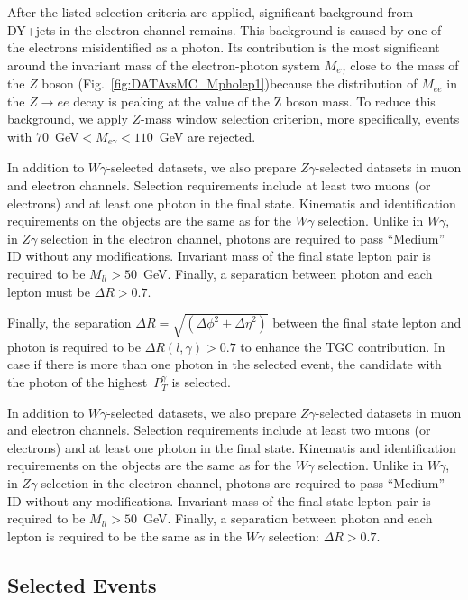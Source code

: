 After the listed selection criteria are applied, significant background from DY+jets in the electron channel remains. This background is caused by one of the electrons misidentified as a photon. Its contribution is the most significant around the invariant mass of the electron-photon system $M_{e\gamma}$ close to the mass of the $Z$ boson (Fig.~\ref{fig:DATAvsMC_Mpholep1})because the distribution of $M_{ee}$ in the $Z\rightarrow e e$ decay is peaking at the value of the Z boson mass. To reduce this background, we apply $Z$-mass window selection criterion, more specifically, events with $70$~GeV$<M_{e\gamma}<110$~GeV are rejected. 

In addition to $W\gamma$-selected datasets, we also prepare $Z\gamma$-selected datasets in muon and electron channels. Selection requirements include at least two muons (or electrons) and at least one photon in the final state. Kinematis and identification requirements on the objects are the same as for the $W\gamma$ selection. Unlike in $W\gamma$, in $Z\gamma$ selection in the electron channel, photons are required to pass ``Medium'' ID without any modifications. Invariant mass of the final state lepton pair is required to be $M_{ll}>50$~GeV. Finally, a separation between photon and each lepton must be $\Delta R>0.7$.

Finally, the separation $\Delta R=\sqrt{({\Delta\phi}^2+{\Delta\eta}^2)}$ between the final state lepton and photon is required to be $\Delta R(l,\gamma)>0.7$ to enhance the TGC contribution. In case if there is more than one photon in the selected event, the candidate with the photon of the highest~$P_T^{\gamma}$ is selected. 

In addition to $W\gamma$-selected datasets, we also prepare $Z\gamma$-selected datasets in muon and electron channels. Selection requirements include at least two muons (or electrons) and at least one photon in the final state. Kinematis and identification requirements on the objects are the same as for the $W\gamma$ selection. Unlike in $W\gamma$, in $Z\gamma$ selection in the electron channel, photons are required to pass ``Medium'' ID without any modifications. Invariant mass of the final state lepton pair is required to be $M_{ll}>50$~GeV. Finally, a separation between photon and each lepton is required to be the same as in the $W\gamma$ selection: $\Delta R>0.7$. 

\subsection{Selected Events}

